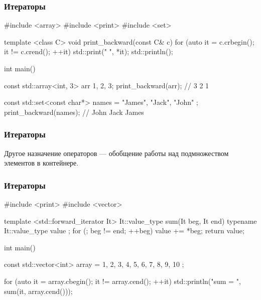 \documentclass[compress, 8pt, aspectratio=169]{beamer}
\begin{document}
  \begin{frame}[fragile]

    \frametitle{Итераторы}

    \begin{mycppinplacelisting}
#include <array>
#include <print>
#include <set>

template <class C>
void print_backward(const C& c) {
    for (auto it = c.crbegin(); it != c.crend(); ++it) {
        std::print("{} ", *it);
    }
    std::println();
}

int main() {
    const std::array<int, 3> arr {1, 2, 3};
    print_backward(arr); // 3 2 1

    const std::set<const char*> names = {
        "James", "Jack", "John"
    };
    print_backward(names); // John Jack James
}
    \end{mycppinplacelisting}

  \end{frame}

  \begin{frame}[fragile]

    \frametitle{Итераторы}

    Другое назначение операторов — обобщение работы
    над подмножеством элементов в контейнере.

  \end{frame}

  \begin{frame}[fragile]

    \frametitle{Итераторы}

    \begin{mycppinplacelisting}
#include <print>
#include <vector>

template <std::forward_iterator It>
It::value_type sum(It beg, It end) {
    typename It::value_type value {};
    for (; beg != end; ++beg) {
        value += *beg;
    }
    return value;
}

int main() {
    const std::vector<int> array = {
        1, 2, 3, 4, 5, 6, 7, 8, 9, 10
    };

    for (auto it = array.cbegin(); it != array.cend(); ++it) {
        std::println("sum = {}", sum(it, array.cend()));
    }
}
    \end{mycppinplacelisting}

  \end{frame}
\end{document}
